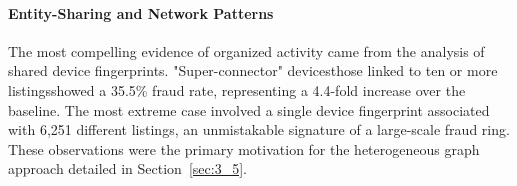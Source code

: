 \paragraph{Entity-Sharing and Network Patterns}

The most compelling evidence of organized activity came from the analysis of shared device fingerprints. "Super-connector" devicesthose linked to ten or more listingsshowed a 35.5\% fraud rate, representing a 4.4-fold increase over the baseline. The most extreme case involved a single device fingerprint associated with 6,251 different listings, an unmistakable signature of a large-scale fraud ring. These observations were the primary motivation for the heterogeneous graph approach detailed in Section~\ref{sec:3_5}.
